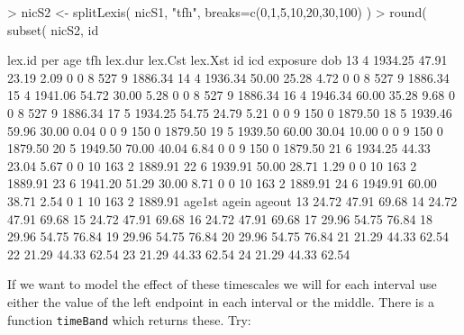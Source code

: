 \documentclass[a4paper,twoside,12pt]{article}
\begin{document}
\begin{Schunk}
\begin{Sinput}
> nicS2 <- splitLexis( nicS1, "tfh", breaks=c(0,1,5,10,20,30,100) )
> round( subset( nicS2, id %in% 8:10 ), 2 )
\end{Sinput}
\begin{Soutput}
   lex.id     per   age   tfh lex.dur lex.Cst lex.Xst id icd exposure     dob
13      4 1934.25 47.91 23.19    2.09       0       0  8 527        9 1886.34
14      4 1936.34 50.00 25.28    4.72       0       0  8 527        9 1886.34
15      4 1941.06 54.72 30.00    5.28       0       0  8 527        9 1886.34
16      4 1946.34 60.00 35.28    9.68       0       0  8 527        9 1886.34
17      5 1934.25 54.75 24.79    5.21       0       0  9 150        0 1879.50
18      5 1939.46 59.96 30.00    0.04       0       0  9 150        0 1879.50
19      5 1939.50 60.00 30.04   10.00       0       0  9 150        0 1879.50
20      5 1949.50 70.00 40.04    6.84       0       0  9 150        0 1879.50
21      6 1934.25 44.33 23.04    5.67       0       0 10 163        2 1889.91
22      6 1939.91 50.00 28.71    1.29       0       0 10 163        2 1889.91
23      6 1941.20 51.29 30.00    8.71       0       0 10 163        2 1889.91
24      6 1949.91 60.00 38.71    2.54       0       1 10 163        2 1889.91
   age1st agein ageout
13  24.72 47.91  69.68
14  24.72 47.91  69.68
15  24.72 47.91  69.68
16  24.72 47.91  69.68
17  29.96 54.75  76.84
18  29.96 54.75  76.84
19  29.96 54.75  76.84
20  29.96 54.75  76.84
21  21.29 44.33  62.54
22  21.29 44.33  62.54
23  21.29 44.33  62.54
24  21.29 44.33  62.54
\end{Soutput}
\end{Schunk}
If we want to model the effect of these timescales we will for each
interval use either the value of the left endpoint in each interval or
the middle. There is a function \texttt{timeBand} which returns these.
Try:
\end{document}
